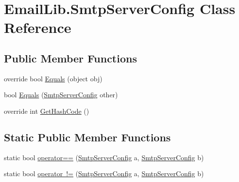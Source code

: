 \hypertarget{classEmailLib_1_1SmtpServerConfig}{}\section{Email\+Lib.\+Smtp\+Server\+Config Class Reference}
\label{classEmailLib_1_1SmtpServerConfig}
\subsection*{Public Member Functions}
\begin{DoxyCompactItemize}
\item 
override bool \mbox{\hyperlink{classEmailLib_1_1SmtpServerConfig_ad3b934765941f8a34ab83555a4313861}{Equals}} (object obj)
\item 
bool \mbox{\hyperlink{classEmailLib_1_1SmtpServerConfig_a3a2b3a9966a2fe362b3ab6a719286de9}{Equals}} (\mbox{\hyperlink{classEmailLib_1_1SmtpServerConfig}{Smtp\+Server\+Config}} other)
\item 
override int \mbox{\hyperlink{classEmailLib_1_1SmtpServerConfig_a621f14a43d3cd61083cd9bb076f9d834}{Get\+Hash\+Code}} ()
\end{DoxyCompactItemize}
\subsection*{Static Public Member Functions}
\begin{DoxyCompactItemize}
\item 
static bool \mbox{\hyperlink{classEmailLib_1_1SmtpServerConfig_aeecf6448a96895c4dc4593f927bd5a73}{operator==}} (\mbox{\hyperlink{classEmailLib_1_1SmtpServerConfig}{Smtp\+Server\+Config}} a, \mbox{\hyperlink{classEmailLib_1_1SmtpServerConfig}{Smtp\+Server\+Config}} b)
\item 
static bool \mbox{\hyperlink{classEmailLib_1_1SmtpServerConfig_aa543a0377e42762e4b84943cf36205a1}{operator !=}} (\mbox{\hyperlink{classEmailLib_1_1SmtpServerConfig}{Smtp\+Server\+Config}} a, \mbox{\hyperlink{classEmailLib_1_1SmtpServerConfig}{Smtp\+Server\+Config}} b)
\end{DoxyCompactItemize}
